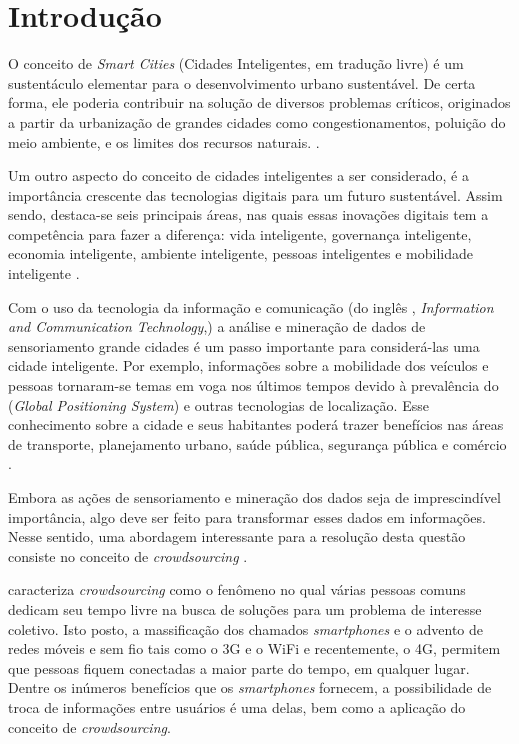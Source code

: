 \chapter{Introdução}\label{cap:introducao}

O conceito de \textit{Smart Cities} (Cidades Inteligentes, em tradução livre) é um sustentáculo elementar para o desenvolvimento urbano sustentável. De certa forma, ele poderia contribuir na solução de diversos problemas críticos, originados a partir da urbanização de grandes cidades como congestionamentos, poluição do meio ambiente, e os limites dos recursos naturais. \cite{pan2013}.
 
Um outro aspecto do conceito de cidades inteligentes a ser considerado, é a importância crescente das tecnologias digitais para um futuro sustentável. Assim sendo, destaca-se seis principais áreas, nas quais essas inovações digitais tem a competência para fazer a diferença: vida inteligente, governança inteligente, economia inteligente, ambiente inteligente, pessoas inteligentes e mobilidade inteligente \cite{schuurman}.
 
Com o uso da tecnologia da informação e comunicação (do inglês {, \emph{Information and Communication Technology},}) a  análise e mineração de dados de sensoriamento grande cidades é um passo importante para considerá-las uma cidade inteligente. Por exemplo, informações sobre a mobilidade dos veículos e pessoas tornaram-se temas em voga nos últimos tempos  devido à prevalência do  (\emph{Global Positioning System}) e outras tecnologias de localização. Esse conhecimento sobre a cidade e seus habitantes poderá trazer benefícios nas áreas de transporte, planejamento urbano, saúde pública, segurança pública e comércio \cite{pan2013}.
 
Embora as ações de sensoriamento e mineração dos dados seja de imprescindível importância, algo deve ser feito para transformar esses dados em informações. Nesse sentido, uma abordagem interessante para a resolução desta questão consiste no conceito de \textit{crowdsourcing} \cite{schuurman}.

 caracteriza \textit{crowdsourcing} como o fenômeno no qual várias pessoas comuns dedicam seu tempo livre na busca de soluções para um problema de interesse coletivo. Isto posto, a massificação dos chamados \textit{smartphones} e o advento de redes móveis e sem fio tais como o 3G e o WiFi e recentemente, o 4G, permitem que pessoas fiquem conectadas a maior parte do tempo, em qualquer lugar. Dentre os inúmeros benefícios que os \textit{smartphones} fornecem, a possibilidade de troca de informações entre usuários é uma delas, bem como a aplicação do conceito de \textit{crowdsourcing}.

